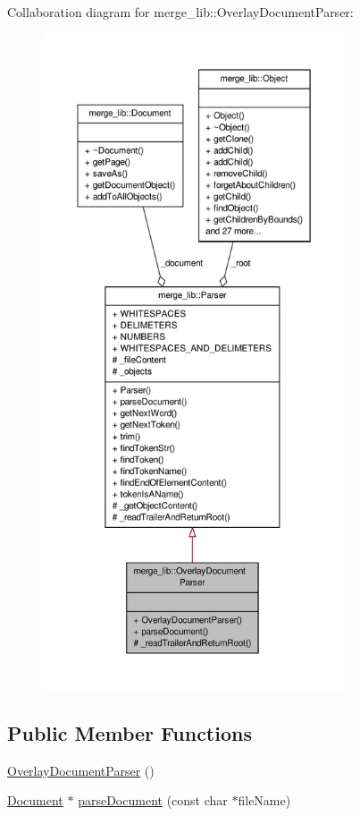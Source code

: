 Collaboration diagram for merge\-\_\-lib\-:\-:Overlay\-Document\-Parser\-:
\nopagebreak
\begin{figure}[H]
\begin{center}
\leavevmode
\includegraphics[height=550pt]{d2/ded/classmerge__lib_1_1_overlay_document_parser__coll__graph}
\end{center}
\end{figure}
\subsection*{Public Member Functions}
\begin{DoxyCompactItemize}
\item 
\hyperlink{classmerge__lib_1_1_overlay_document_parser_a0454d77d52b23e0b857d39d4ae6c9da6}{Overlay\-Document\-Parser} ()
\item 
\hyperlink{classmerge__lib_1_1_document}{Document} $\ast$ \hyperlink{classmerge__lib_1_1_overlay_document_parser_a03f2f36e4e57c5c6cfb37933bc82c801}{parse\-Document} (const char $\ast$file\-Name)
\end{DoxyCompactItemize}
